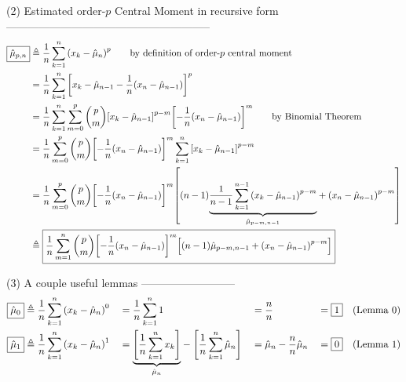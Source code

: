 (2) Estimated order-$p$ Central Moment in recursive form
--------------------------------------------------------
\begin{align*}
  \boxed{\hat{\mu}_{p,n}}
    &\triangleq \frac{1}{n} \sum_{k=1}^{n} {\left( x_k - \hat{\mu}_n \right)}^p
          \qquad\text{by definition of order-$p$ central moment}
  \\&=    \frac{1}{n} \sum_{k=1}^{n} {\left[ x_k - \hat{\mu}_{n-1} - \frac{1}{n}{\left( x_n - \hat{\mu}_{n-1} \right)} \right]}^p
  \\&=    \frac{1}{n} \sum_{k=1}^{n} \sum_{m=0}^p {p\choose m} {\left[ x_k - \hat{\mu}_{n-1} \right]}^{p-m} {\left[ - \frac{1}{n}{\left( x_n - \hat{\mu}_{n-1} \right)} \right]}^m
          \qquad\text{by Binomial Theorem}
  \\&=    \frac{1}{n} \sum_{m=0}^p {p\choose m}  {\left[ - \frac{1}{n}{\left( x_n - \hat{\mu}_{n-1} \right)} \right]}^m  \sum_{k=1}^{n} {\left[ x_k - \hat{\mu}_{n-1} \right]}^{p-m}
  \\&=    \frac{1}{n} \sum_{m=0}^p {p\choose m}  {\left[ - \frac{1}{n}{\left( x_n - \hat{\mu}_{n-1} \right)} \right]}^m
                      {\left[(n-1){\displaystyle\underbrace{\displaystyle\frac{1}{n-1}\sum_{k=1}^{n-1} {\left( x_k - \hat{\mu}_{n-1} \right)}^{p-m}}_{\text{$\hat{\mu}_{p-m,n-1}$}}} + {\left( x_n - \hat{\mu}_{n-1} \right)}^{p-m} \right]}
  \\&\triangleq \boxed{
          \frac{1}{n} \sum_{m=1}^n {p\choose m}
          {\left[ -\frac{1}{n}{\left(x_n-\hat{\mu}_{n-1}\right)} \right]}^m
          {\left[ (n-1) \hat{\mu}_{p-m,n-1} + {\left( x_n - \hat{\mu}_{n-1} \right)}^{p-m} \right]}}
\end{align*}

(3) A couple useful lemmas
--------------------------
\begin{align*}
  \boxed{\hat{\mu}_0}
    &\triangleq \frac{1}{n} \sum_{k=1}^{n} {\left( x_k - \hat{\mu}_n \right)}^0
   &&=  \frac{1}{n} \sum_{k=1}^{n} 1
   &&=  \frac{n}{n}
   &&=  \boxed{1}
   &&   \text{(Lemma 0)}
  \\
  \boxed{\hat{\mu}_1}
    &\triangleq \frac{1}{n} \sum_{k=1}^{n} {\left( x_k - \hat{\mu}_n \right)}^1
   &&= {\displaystyle\underbrace{\displaystyle{\left[\frac{1}{n} \sum_{k=1}^{n} x_k\right]}}_{\text{$\hat{\mu}_n$}}} - {\left[\frac{1}{n} \sum_{k=1}^{n} \hat{\mu}_n \right]}
   &&= \hat{\mu}_n - \frac{n}{n} \hat{\mu}_n
   &&= \boxed{0}
   && \text{(Lemma 1)}
\end{align*}

